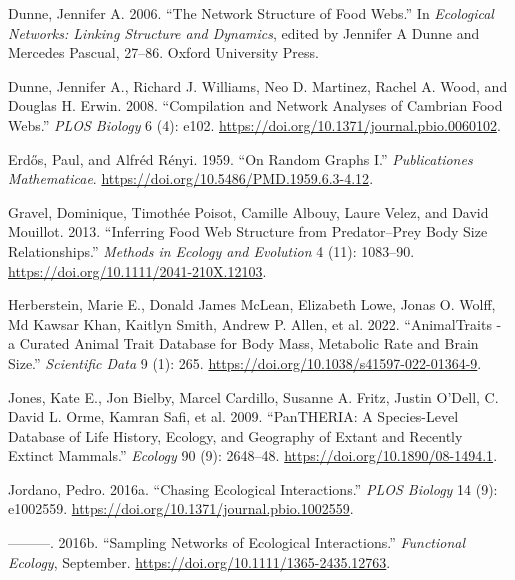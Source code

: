 \documentclass[
  letterpaper,
  DIV=11,
  numbers=noendperiod]{scrartcl}
\newlength{\cslhangindent}
\newenvironment{CSLReferences}[2] %
 {\begin{list}{}{%
  \setlength{\itemindent}{0pt}
  \setlength{\leftmargin}{0pt}
  \setlength{\parsep}{0pt}
  \ifodd #1
   \setlength{\leftmargin}{\cslhangindent}
   \setlength{\itemindent}{-1\cslhangindent}
  \fi
  \setlength{\itemsep}{#2\baselineskip}}}
 {\end{list}}
\begin{document}
\begin{CSLReferences}{1}{0}
Dunne, Jennifer A. 2006. {``The {Network Structure} of {Food Webs}.''}
In \emph{Ecological Networks: {Linking} Structure and Dynamics}, edited
by Jennifer A Dunne and Mercedes Pascual, 27--86. Oxford University
Press.

Dunne, Jennifer A., Richard J. Williams, Neo D. Martinez, Rachel A.
Wood, and Douglas H. Erwin. 2008. {``Compilation and {Network Analyses}
of {Cambrian Food Webs}.''} \emph{PLOS Biology} 6 (4): e102.
\url{https://doi.org/10.1371/journal.pbio.0060102}.

Erdős, Paul, and Alfréd Rényi. 1959. {``On {Random Graphs I}.''}
\emph{Publicationes Mathematicae}.
\url{https://doi.org/10.5486/PMD.1959.6.3-4.12}.

Gravel, Dominique, Timothée Poisot, Camille Albouy, Laure Velez, and
David Mouillot. 2013. {``Inferring Food Web Structure from
Predator--Prey Body Size Relationships.''} \emph{Methods in Ecology and
Evolution} 4 (11): 1083--90.
\url{https://doi.org/10.1111/2041-210X.12103}.

Herberstein, Marie E., Donald James McLean, Elizabeth Lowe, Jonas O.
Wolff, Md Kawsar Khan, Kaitlyn Smith, Andrew P. Allen, et al. 2022.
{``{AnimalTraits} - a Curated Animal Trait Database for Body Mass,
Metabolic Rate and Brain Size.''} \emph{Scientific Data} 9 (1): 265.
\url{https://doi.org/10.1038/s41597-022-01364-9}.

Jones, Kate E., Jon Bielby, Marcel Cardillo, Susanne A. Fritz, Justin
O'Dell, C. David L. Orme, Kamran Safi, et al. 2009. {``{PanTHERIA}: A
Species-Level Database of Life History, Ecology, and Geography of Extant
and Recently Extinct Mammals.''} \emph{Ecology} 90 (9): 2648--48.
\url{https://doi.org/10.1890/08-1494.1}.

Jordano, Pedro. 2016a. {``Chasing {Ecological Interactions}.''}
\emph{PLOS Biology} 14 (9): e1002559.
\url{https://doi.org/10.1371/journal.pbio.1002559}.

---------. 2016b. {``Sampling Networks of Ecological Interactions.''}
\emph{Functional Ecology}, September.
\url{https://doi.org/10.1111/1365-2435.12763}.


\end{CSLReferences}
\end{document}
